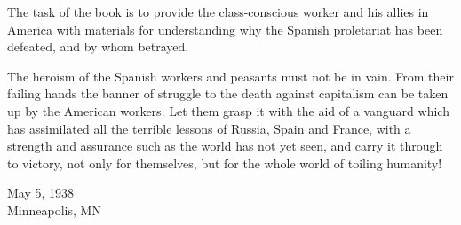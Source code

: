 The task of the book is to provide the class-conscious worker and his allies in America with materials for understanding why the Spanish proletariat has been defeated, and by whom betrayed.

The heroism of the Spanish workers and peasants must not be in vain. From their failing hands the banner of struggle to the death against capitalism can be taken up by the American workers. Let them grasp it with the aid of a vanguard which has assimilated all the terrible lessons of Russia, Spain and France, with a strength and assurance such as the world has not yet seen, and carry it through to victory\kn, not only for themselves, but for the whole world of toiling humanity!

\begin{flushright}
  May 5, 1938 \\
  Minneapolis, MN
\end{flushright}